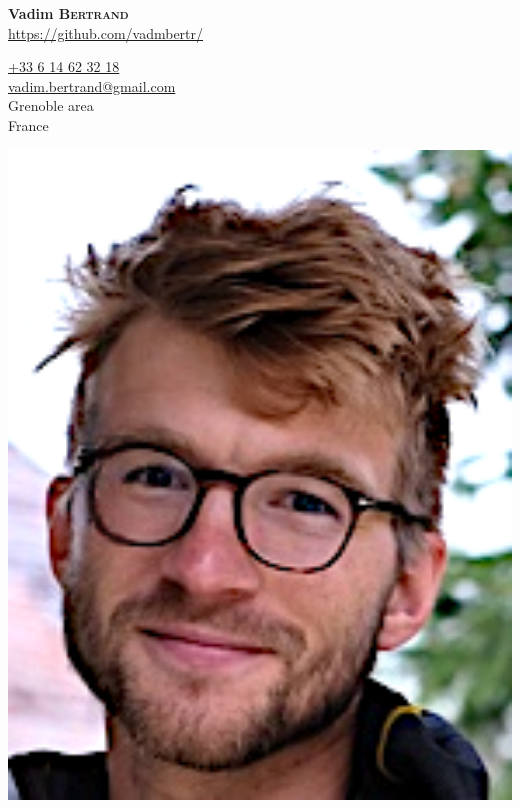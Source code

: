 \documentclass{article}
\begin{document}

\begin{minipage}{1\textwidth}
    \begin{minipage}{.5\textwidth}
        \vspace{.2cm}
        {\huge \textbf{Vadim \textsc{Bertrand}}}\\[.3 cm]
        \url{https://github.com/vadmbertr/}
    \end{minipage}
    \begin{minipage}{.44\textwidth}
    \begin{flushright}
        \begin{minipage}{.74\textwidth}
        \begin{flushright}
            \href{tel:33614623218}{+33 6 14 62 32 18} \\[.1 cm]
            \href{mailto:vadim.bertrand@gmail.com}{vadim.bertrand@gmail.com} \\[.1 cm]
            Grenoble area \\[.1 cm]
            France
        \end{flushright}
        \end{minipage}
        \begin{minipage}{.24\textwidth}
        \begin{flushright}
            \includegraphics[width=1\textwidth]{picture.png}
        \end{flushright}
        \end{minipage}
    \end{flushright}
    \end{minipage}
\end{minipage}
\end{document}
